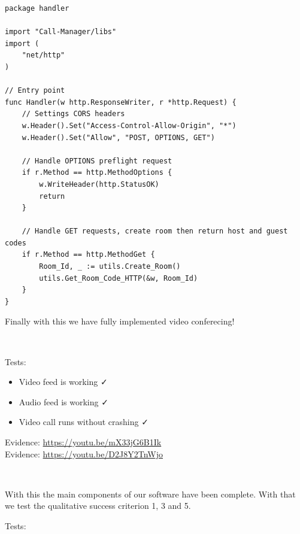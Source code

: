 \begin{verbatim}
package handler

import "Call-Manager/libs"
import (
	"net/http"
)

// Entry point
func Handler(w http.ResponseWriter, r *http.Request) {
	// Settings CORS headers
	w.Header().Set("Access-Control-Allow-Origin", "*")
	w.Header().Set("Allow", "POST, OPTIONS, GET")

	// Handle OPTIONS preflight request
	if r.Method == http.MethodOptions {
		w.WriteHeader(http.StatusOK)
		return
	}

    // Handle GET requests, create room then return host and guest codes
    if r.Method == http.MethodGet {
    	Room_Id, _ := utils.Create_Room()
        utils.Get_Room_Code_HTTP(&w, Room_Id)
    }
}
\end{verbatim}

Finally with this we have fully implemented video conferecing!

{\color{gray} \hrulefill} \\ \vspace{0.2cm}

{\sffamily Tests:}

\begin{itemize}
  \item Video feed is working \faCheck \\
  \item Audio feed is working \faCheck \\
  \item Video call runs without crashing \faCheck \\
\end{itemize}

{\sffamily Evidence: } \url{https://youtu.be/mX33jG6B1Ik} \\ \vspace{0.2cm}
{\sffamily Evidence: } \url{https://youtu.be/D2J8Y2TnWjo} \\ \vspace{0.2cm}

{\color{gray} \hrulefill} \\ \vspace{0.2cm}

With this the main components of our software have
been complete. With that we test the qualitative
success criterion 1, 3 and 5. \\ \vspace{0.2cm}

{\sffamily Tests:}

